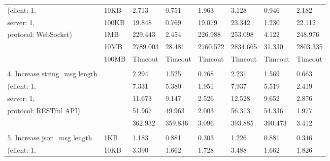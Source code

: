 \begin{table}[htbp]
\begin{tabular}{m{} m{} m{} m{} m{} m{} m{} m{}}
    (client: 1,                      & 10KB       & 2.713             & 0.751    & 1.963                   & 3.128             & 0.946    & 2.182                   \\
    server: 1,                       & 100KB      & 19.848            & 0.769    & 19.079                  & 23.342            & 1.230    & 22.112                  \\
    protocol: WebSocket)             & 1MB        & 229.443           & 2.454    & 226.988                 & 253.098           & 4.122    & 248.976                 \\
                                     & 10MB       & 2789.003          & 28.481   & 2760.522                & 2834.665          & 31.330   & 2803.335                \\
                                     & 100MB      & Timeout           & Timeout  & Timeout                 & Timeout           & Timeout  & Timeout                 \\
    & & & & & & &\\
    4. Increase string\_msg length   &            & 2.294             & 1.525    & 0.768                   & 2.231             & 1.569    & 0.663                   \\
    (client: 1,                      &            & 7.331             & 5.380    & 1.951                   & 7.937             & 5.519    & 2.419                   \\
    server: 1,                       &            & 11.673            & 9.147    & 2.526                   & 12.528            & 9.652    & 2.876                   \\
    protocol: RESTful API)           &            & 51.967            & 49.963   & 2.003                   & 56.313            & 54.336   & 1.977                   \\
                                     &            & 362.932           & 359.836  & 3.096                   & 393.885           & 390.473  & 3.412                   \\
    & & & & & & &\\
    5. Increase json\_msg length     & 1KB        & 1.183             & 0.881    & 0.303                   & 1.226             & 0.881    & 0.346                   \\
    (client: 1,                      & 10KB       & 3.390             & 1.662    & 1.728                   & 3.488             & 1.662    & 1.826                   \\

\end{tabular}
\end{table}
